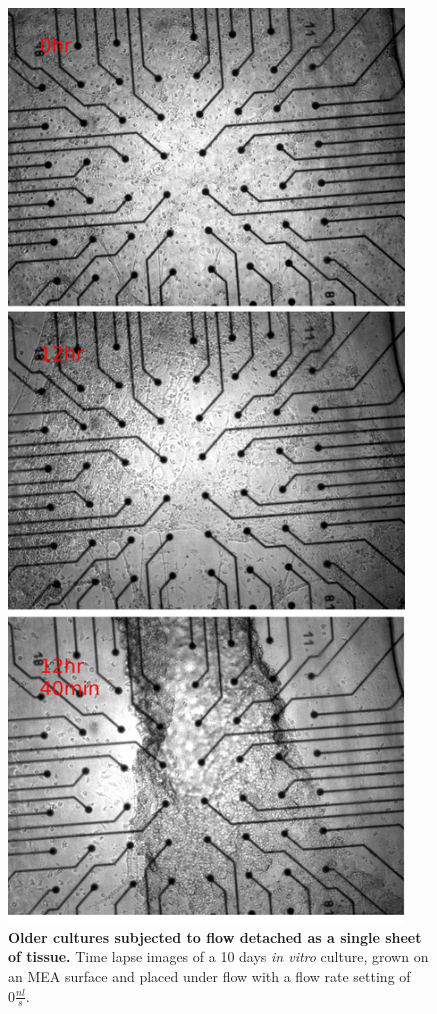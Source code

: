         \begin{figure}
            \centering
            \includegraphics[width=10.5cm]{appendix/tissueDetachment/tissueDet.jpg}
            \caption[Time lapse of culture under flow exhibiting complete tissue detachment]{\textbf{Older cultures subjected to flow detached as a single sheet of tissue.} Time lapse images of a 10 days \textit{in vitro} culture, grown on an MEA surface and placed under flow with a flow rate setting of \(0\frac{nl}{s}\).}
            \label{fig:app:culturePeel}

        \end{figure}

